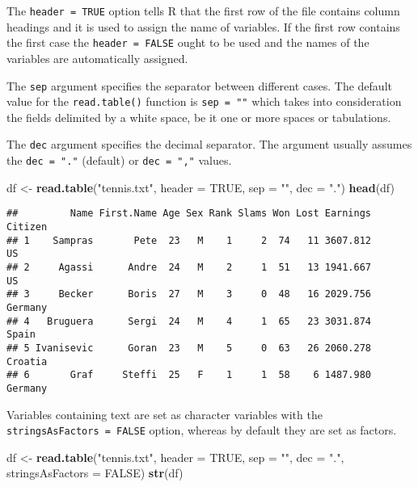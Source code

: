 \documentclass[]{book}
\newenvironment{Shaded}{\begin{snugshade}}{\end{snugshade}}
\newcommand{\KeywordTok}[1]{\textcolor[rgb]{0.13,0.29,0.53}{\textbf{{#1}}}}
\newcommand{\DataTypeTok}[1]{\textcolor[rgb]{0.13,0.29,0.53}{{#1}}}
\newcommand{\StringTok}[1]{\textcolor[rgb]{0.31,0.60,0.02}{{#1}}}
\newcommand{\OtherTok}[1]{\textcolor[rgb]{0.56,0.35,0.01}{{#1}}}
\newcommand{\NormalTok}[1]{{#1}}
\begin{document}
The \texttt{header\ =\ TRUE} option tells R that the first row of the
file contains column headings and it is used to assign the name of
variables. If the first row contains the first case the
\texttt{header\ =\ FALSE} ought to be used and the names of the
variables are automatically assigned.

The \texttt{sep} argument specifies the separator between different
cases. The default value for the \texttt{read.table()} function is
\texttt{sep\ =\ ""} which takes into consideration the fields delimited
by a white space, be it one or more spaces or tabulations.

The \texttt{dec} argument specifies the decimal separator. The argument
usually assumes the \texttt{dec\ =\ "."} (default) or
\texttt{dec\ =\ ","} values.

\begin{Shaded}
\begin{Highlighting}[]
\NormalTok{df <-}\StringTok{ }\KeywordTok{read.table}\NormalTok{(}\StringTok{"tennis.txt"}\NormalTok{, }\DataTypeTok{header =} \OtherTok{TRUE}\NormalTok{, }\DataTypeTok{sep =} \StringTok{""}\NormalTok{, }\DataTypeTok{dec =} \StringTok{"."}\NormalTok{)}
\KeywordTok{head}\NormalTok{(df)}
\end{Highlighting}
\end{Shaded}

\begin{verbatim}
##         Name First.Name Age Sex Rank Slams Won Lost Earnings Citizen
## 1    Sampras       Pete  23   M    1     2  74   11 3607.812      US
## 2     Agassi      Andre  24   M    2     1  51   13 1941.667      US
## 3     Becker      Boris  27   M    3     0  48   16 2029.756 Germany
## 4   Bruguera      Sergi  24   M    4     1  65   23 3031.874   Spain
## 5 Ivanisevic      Goran  23   M    5     0  63   26 2060.278 Croatia
## 6       Graf     Steffi  25   F    1     1  58    6 1487.980 Germany
\end{verbatim}

Variables containing text are set as character variables with the
\texttt{stringsAsFactors\ =\ FALSE} option, whereas by default they are
set as factors.

\begin{Shaded}
\begin{Highlighting}[]
\NormalTok{df <-}\StringTok{ }\KeywordTok{read.table}\NormalTok{(}\StringTok{"tennis.txt"}\NormalTok{, }\DataTypeTok{header =} \OtherTok{TRUE}\NormalTok{, }\DataTypeTok{sep =} \StringTok{""}\NormalTok{, }\DataTypeTok{dec =} \StringTok{"."}\NormalTok{, }\DataTypeTok{stringsAsFactors =} \OtherTok{FALSE}\NormalTok{)}
\KeywordTok{str}\NormalTok{(df)}
\end{Highlighting}
\end{Shaded}
\end{document}
